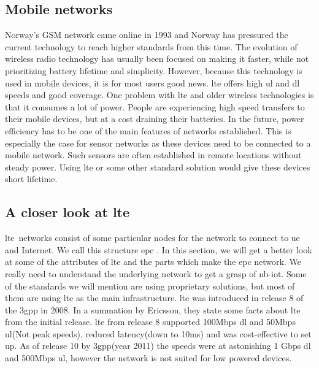 \documentclass[USenglish]{ifimaster}  %
\begin{document}
\subsection{Mobile networks}
Norway's GSM network came online in 1993 \cite{online:gsmTelenorNetcom} and Norway has pressured the current technology to reach higher standards from this time. The evolution of wireless radio technology has usually been focused on making it faster, while not prioritizing battery lifetime and simplicity. However, because this technology is used in mobile devices, it is for most users good news. \acrshort{lte} offers high \acrfull{ul} and \acrfull{dl} speeds and good coverage. One problem with \acrshort{lte} and older wireless technologies is that it consumes a lot of power. People are experiencing high speed transfers to their mobile devices, but at a cost draining their batteries. In the future, power efficiency has to be one of the main features of networks established. This is especially the case for sensor networks as these devices need to be connected to a mobile network. Such sensors are often established in remote locations without steady power. Using \acrshort{lte} or some other standard solution would give these devices short lifetime.

\subsection{A closer look at \acrshort{lte}} \label{ssection:lte}
\acrfull{lte} networks consist of some particular nodes for the network to connect to \acrfull{ue} and Internet. We call this structure \acrfull{epc} \cite{online:epc}. In this section, we will get a better look at some of the attributes of \acrshort{lte} and the parts which make the \acrshort{epc} network. We really need to understand the underlying network to get a grasp of \acrshort{nb-iot}. Some of the standards we will mention are using proprietary solutions, but most of them are using \acrshort{lte} as the main infrastructure. \acrshort{lte} was introduced in release 8 of the \acrshort{3gpp} in 2008. In a summation by Ericsson, they state some facts about \acrshort{lte} from the initial release. \acrshort{lte} from release 8 supported 100Mbps \acrshort{dl} and 50Mbps \acrshort{ul}(Not peak speeds), reduced latency(down to 10ms) and was cost-effective to set up\cite{online:lteIntroduction}. As of release 10 by \acrshort{3gpp}(year 2011) the speeds were at astonishing 1 Gbps \acrshort{dl} and 500Mbps \acrshort{ul}, however the network is not suited for low powered devices.
\end{document}
